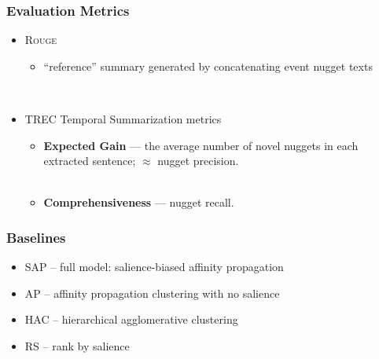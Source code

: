 \begin{frame}
    \frametitle{Evaluation Metrics}
    \begin{itemize}
        \item \textsc{Rouge}
        \begin{itemize}
            \item ``reference'' summary generated by concatenating event 
                    nugget texts
        \end{itemize}
~\\
    \item TREC Temporal Summarization metrics
        \begin{itemize}
            \item  \textbf{Expected Gain} --- the average number of novel nuggets in 
                each extracted sentence; $\approx$ nugget precision. ~\\~\\
            \item \textbf{Comprehensiveness} --- nugget recall.
        \end{itemize}
    \end{itemize}
\end{frame}

\begin{frame}
    \frametitle{Baselines}
    \begin{itemize}
    \item SAP -- full model: salience-biased affinity propagation
    \item AP -- affinity propagation clustering with no salience
    \item HAC -- hierarchical agglomerative clustering
    \item RS -- rank by salience
    \end{itemize}
\end{frame}

